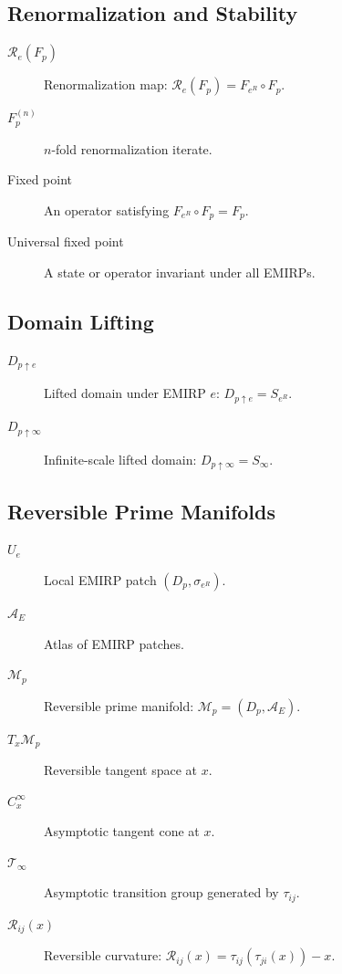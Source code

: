 \documentclass[11pt]{article}
\theoremstyle{definition}
\theoremstyle{plain}
\theoremstyle{remark}
\begin{document}
\subsection*{Renormalization and Stability}

\begin{description}

\item[$\mathcal{R}_e(F_p)$] Renormalization map:
$\mathcal{R}_e(F_p) = F_{e^R} \circ F_p$.

\item[$F_p^{(n)}$] $n$-fold renormalization iterate.

\item[Fixed point] An operator satisfying $F_{e^R} \circ F_p = F_p$.

\item[Universal fixed point] A state or operator invariant under all
EMIRPs.

\end{description}

\subsection*{Domain Lifting}

\begin{description}

\item[$D_{p \uparrow e}$] Lifted domain under EMIRP $e$:
$D_{p \uparrow e} = S_{e^R}$.

\item[$D_{p \uparrow \infty}$] Infinite-scale lifted domain:
$D_{p \uparrow \infty} = S_\infty$.

\end{description}

\subsection*{Reversible Prime Manifolds}

\begin{description}

\item[$U_e$] Local EMIRP patch $(D_p, \sigma_{e^R})$.

\item[$\mathcal{A}_E$] Atlas of EMIRP patches.

\item[$\mathcal{M}_p$] Reversible prime manifold:
$\mathcal{M}_p = (D_p, \mathcal{A}_E)$.

\item[$T_x \mathcal{M}_p$] Reversible tangent space at $x$.

\item[$C_x^\infty$] Asymptotic tangent cone at $x$.

\item[$\mathcal{T}_\infty$] Asymptotic transition group generated by
$\tau_{ij}$.

\item[$\mathcal{R}_{ij}(x)$] Reversible curvature:
$\mathcal{R}_{ij}(x) = \tau_{ij}(\tau_{ji}(x)) - x$.

\end{description}
\end{document}
